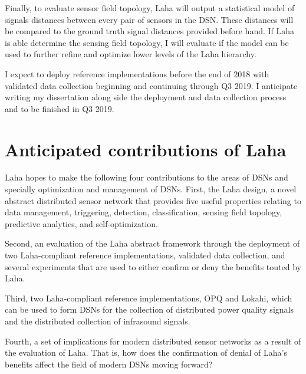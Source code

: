 Finally, to evaluate sensor field topology, Laha will output a statistical model of signals distances between every pair of sensors in the DSN. These distances will be compared to the ground truth signal distances provided before hand. If  Laha is able determine the sensing field topology, I will evaluate if the model can be used to further refine and optimize lower levels of the Laha hierarchy.


I expect to deploy reference implementations before the end of 2018 with validated data collection beginning and continuing through Q3 2019. I anticipate writing my dissertation along side the deployment and data collection process and to be finished in Q3 2019.

\section{Anticipated contributions of Laha}
Laha hopes to make the following four contributions to the areas of DSNs and specially optimization and management of DSNs.  First, the Laha design, a novel abstract distributed sensor network that provides five useful properties relating to data management, triggering, detection, classification, sensing field topology, predictive analytics, and self-optimization.

Second, an evaluation of the Laha abstract framework through the deployment of two Laha-compliant reference implementations, validated data collection, and several experiments that are used to either confirm or deny the benefits touted by Laha. 

Third, two Laha-compliant reference implementations, OPQ and Lokahi, which can be used to form DSNs for the collection of distributed power quality signals and the distributed collection of infrasound signals.

Fourth, a set of implications for modern distributed sensor networks as a result of the evaluation of Laha. That is, how does the confirmation of denial of Laha's benefits affect the field of modern DSNs moving forward?





